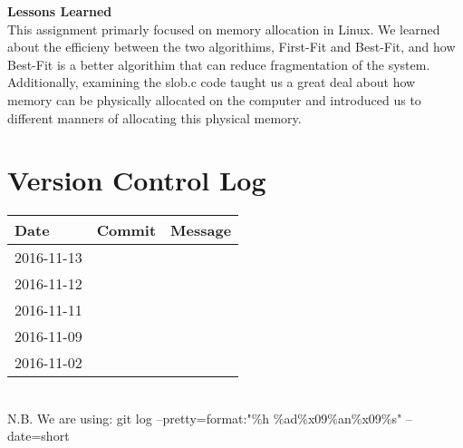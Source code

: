 \documentclass[letterpaper,10pt,draftclsnofoot,titlepage,onecolumn]{IEEEtran}
\begin{document}
	\textbf{Lessons Learned}\\

	This assignment primarly focused on memory allocation in Linux. We learned about the efficieny between the two algorithims, First-Fit and Best-Fit, and how Best-Fit is a better algorithim that can reduce fragmentation of the system. Additionally, examining the slob.c code taught us a great deal about how memory can be physically allocated on the computer and introduced us to different manners of allocating this physical memory. 


	\clearpage

	\section{Version Control Log}
	
\begin{center}

\begin{tabular}{| m{2cm} | m{8cm} | m{4cm} | } 
\hline
 Date & Commit & Message \\ [0.5ex] 
 \hline\hline
2016-11-13 &  &  \\
 \hline 
  2016-11-12 &  & \\
 \hline
  2016-11-11 &  &  \\
 \hline
  2016-11-09 &  &  \\
 \hline
   2016-11-02 &  &  \\
 \hline
 
\end{tabular}

\end{center}
\hfill\\
N.B. We are using: git log --pretty=format:"\%h \%ad\%x09\%an\%x09\%s" --date=short
	
\clearpage
\end{document}
